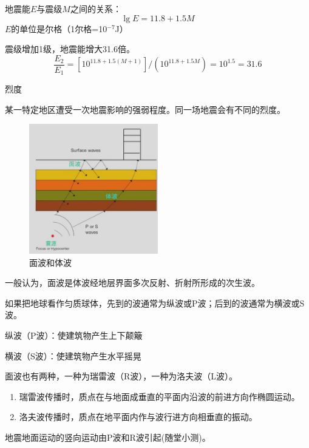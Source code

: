 \documentclass[12pt, a4paper, oneside, UTF8]{ctexbook}
\begin{document}
\begin{definition}
    地震能$E$与震级$M$之间的关系：
$$ \lg E = 11.8 + 1.5M $$
$E$的单位是尔格（1尔格=10$^{-7}$J）

震级增加1级，地震能增大31.6倍。
$$ \frac{E_2}{E_1} = \left[ 10^{11.8 + 1.5(M+1)} \right] / \left( 10^{11.8 + 1.5M} \right) = 10^{1.5} = 31.6 $$
\end{definition}

\begin{definition}
    烈度

某一特定地区遭受一次地震影响的强弱程度。同一场地震会有不同的烈度。
\end{definition}

\begin{figure}[H]
    \centering
    \includegraphics[width=0.5\textwidth]{../figure/dizhenbo.png}
    \caption{面波和体波}
\end{figure}

\begin{remark}
    一般认为，面波是体波经地层界面多次反射、折射所形成的次生波。

    如果把地球看作匀质球体，先到的波通常为纵波或P波；后到的波通常为横波或S波。

    纵波（P波）：使建筑物产生上下颠簸

    横波（S波）：使建筑物产生水平摇晃
\end{remark}

面波也有两种，一种为瑞雷波（R波），一种为洛夫波（L波）。

\begin{enumerate}
    \item 瑞雷波传播时，质点在与地面成垂直的平面内沿波的前进方向作椭圆运动。
    \item 洛夫波传播时，质点在地平面内作与波行进方向相垂直的振动。
\end{enumerate}

\begin{remark}
    地震地面运动的竖向运动由P波和R波引起(随堂小测)。
\end{remark}
\end{document}
